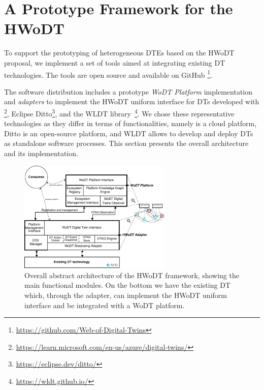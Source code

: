 \section{A Prototype Framework for the \acs{HWoDT}}
\label{sec:hwodt-impl}

To support the prototyping of heterogeneous \acp{DTE} based on the \ac{HWoDT} proposal, we implement a set of tools aimed at integrating existing \ac{DT} technologies.
%
The tools are open source and available on GitHub
\footnote{\url{https://github.com/Web-of-Digital-Twins}}. 

The software distribution includes a prototype \emph{\ac{WoDT} Platform} implementation and \emph{adapters} to implement the \ac{HWoDT} uniform interface for \acp{DT} developed with \azureTwin{}\footnote{\url{https://learn.microsoft.com/en-us/azure/digital-twins/}}, Eclipse Ditto\footnote{\url{https://eclipse.dev/ditto/}}, and the \ac{WLDT} library~\cite{picone2021wldt}\footnote{\url{https://wldt.github.io/}}.
We chose these representative technologies as they differ in terms of functionalities, namely \azureTwin{} is a cloud platform, Ditto is an open-source platform, and \ac{WLDT} allows to develop and deploy \acp{DT} as standalone software processes.
This section presents the overall architecture and its implementation.


\begin{figure}[t]
  \centering
  \includegraphics[width=0.65\textwidth]{figures/hwodt/abstract_arch.pdf}
  \caption{Overall abstract architecture of the \ac{HWoDT} framework, showing the main functional modules. On the bottom we have the existing \ac{DT} which, through the adapter, can implement the \ac{HWoDT} uniform interface and be integrated with a \ac{WoDT} platform.}
  \label{fig:abstract_arch}
\end{figure}


